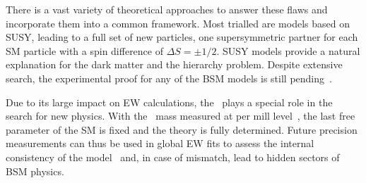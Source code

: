 There is a vast variety of theoretical approaches to answer these flaws and incorporate them into a common framework.
%
Most trialled are models based on \gls{SUSY}, leading to a full set of new particles, one supersymmetric partner for each \gls{SM} particle with a spin difference of $\Delta S=\pm1/2$. \gls{SUSY} models provide a natural explanation for the dark matter and the hierarchy problem. 
%
Despite extensive search, the experimental proof for any of the \gls{BSM} models is still pending~\cite{Aad:2015baa,CMS-PAS-SUS-15-010}.
%

Due to its large impact on \gls{EW} calculations, the \tquark\ plays a special role in the search for new physics. With the \Hboson\ mass measured at per mill level~\cite{Aad:2015zhl}, the last free parameter of the \gls{SM} is fixed and the theory is fully determined. Future precision measurements can thus be used in global \gls{EW} fits to assess the internal consistency of the model~\cite{Baak2014} and, in case of mismatch, lead to hidden sectors of \gls{BSM} physics. 











